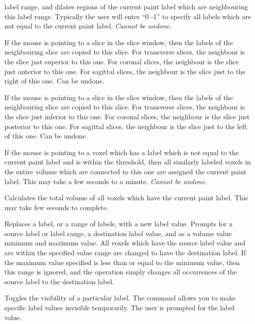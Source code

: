 \documentclass[11pt,letterpaper]{article}
\newcommand{\menutwo}[2]{{\scriptsize \fbox{\bf #1}/\fbox{\bf #2}}}
\begin{document}
\begin{description}
  label range, and dilates regions of the current paint label which are
  neighbouring this label range. Typically the user will enter
  ``0 -1'' to specify all labels which are not equal to the current
  paint label. {\em Cannot be undone}.
\item[\menutwo{Segmenting}{Copy from Rt/Sup/Ant}] If the mouse is
  pointing to a slice in the slice window, then the labels of the
  neighbouring slice are copied to this slice.  For transverse slices,
  the neighbour is the slice just superior to this one.  For coronal
  slices, the neighbour is the slice just anterior to this one.  For
  sagittal slices, the neighbour is the slice just to the right of this
  one. Can be undone.
\item[\menutwo{Segmenting}{Copy from Lt/Inf/Pos}] If the mouse is
  pointing to a slice in the slice window, then the labels of the
  neighbouring slice are copied to this slice.  For transverse slices,
  the neighbour is the slice just inferior to this one.  For coronal
  slices, the neighbour is the slice just posterior to this one.  For
  sagittal slices, the neighbour is the slice just to the left of this
  one. Can be undone.
\item[\menutwo{Segmenting}{Fill 3D}] If the mouse is pointing to a voxel
  which has a label which is not equal to the current paint label and is
  within the threshold, then all similarly labeled voxels in the entire
  volume which are connected to this one are assigned the current paint
  label.  This may take a few seconds to a minute. {\em Cannot be undone}.
\item[\menutwo{Segmenting}{Calculate Volume}] Calculates the total
  volume of all voxels which have the current paint label. This may
  take few seconds to complete.
\item[\menutwo{Segmenting}{Change Labels}] Replaces a label, or a range of 
  labels, with a new label value. Prompts for a source label or label range, a
  destination label value, and as a volume value minimum and maximum
  value. All voxels which have the source label value and are within
  the specified value range are changed to have the destination label.
  If the maximum value specified is less than or equal to the minimum value,
  then this range is ignored, and the operation simply changes all
  occurrences of the source label to the destination label.
\item[\menutwo{Segmenting}{Show/Hide Label}] Toggles the visibility
  of a particular label. The command allows you to make specific label
  values invisible temporarily. The user is prompted for the label value.

\end{description}
\end{document}
